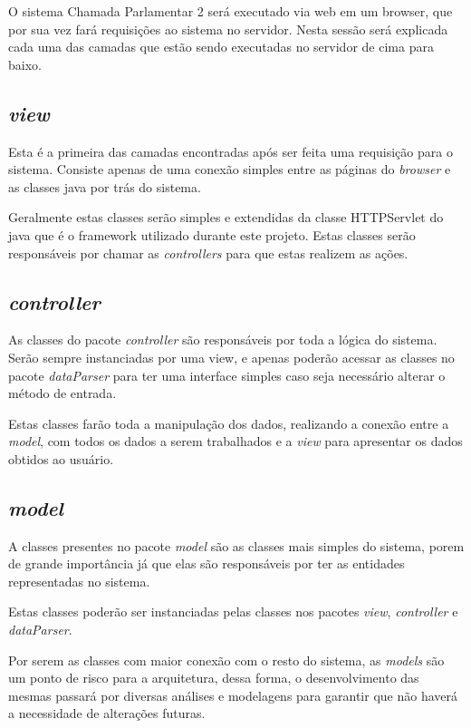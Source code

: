 O sistema Chamada Parlamentar 2 será executado via web em um browser, que por sua vez fará requisições ao sistema no servidor. Nesta sessão será explicada cada uma das camadas que estão sendo executadas no servidor de cima para baixo.

\subsection{\textit{view}}
	
	Esta é a primeira das camadas encontradas após ser feita uma requisição para o sistema. Consiste apenas de uma conexão simples entre as páginas do \textit{browser} e as classes java por trás do sistema.

	Geralmente estas classes serão simples e extendidas da classe HTTPServlet do java que é o framework utilizado durante este projeto. Estas classes serão responsáveis por chamar as \textit{controllers} para que estas realizem as ações.

\subsection{\textit{controller}}

	As classes do pacote \textit{controller} são responsáveis por toda a lógica do sistema. Serão sempre instanciadas por uma view, e apenas poderão acessar as classes no pacote \textit{dataParser} para ter uma interface simples caso seja necessário alterar o método de entrada.

	Estas classes farão toda a manipulação dos dados, realizando a conexão entre a \textit{model}, com todos os dados a serem trabalhados e a \textit{view} para apresentar os dados obtidos ao usuário.

\subsection{\textit{model}}

	A classes presentes no pacote \textit{model} são as classes mais simples do sistema, porem de grande importância já que elas são responsáveis por ter as entidades representadas no sistema.

	Estas classes poderão ser instanciadas pelas classes nos pacotes \textit{view}, \textit{controller} e \textit{dataParser}.

	Por serem as classes com maior conexão com o resto do sistema, as \textit{models} são um ponto de risco para a arquitetura, dessa forma, o desenvolvimento das mesmas passará por diversas análises e modelagens para garantir que não haverá a necessidade de alterações futuras.

